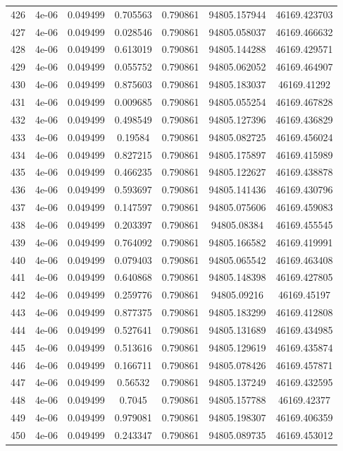 \begin{table}
\begin{tabular*}{\linewidth}{c|c|c|c|c|c|c}
426 & 4e-06 & 0.049499 & 0.705563 & 0.790861 & 94805.157944 & 46169.423703\\
427 & 4e-06 & 0.049499 & 0.028546 & 0.790861 & 94805.058037 & 46169.466632\\
428 & 4e-06 & 0.049499 & 0.613019 & 0.790861 & 94805.144288 & 46169.429571\\
429 & 4e-06 & 0.049499 & 0.055752 & 0.790861 & 94805.062052 & 46169.464907\\
430 & 4e-06 & 0.049499 & 0.875603 & 0.790861 & 94805.183037 & 46169.41292\\
431 & 4e-06 & 0.049499 & 0.009685 & 0.790861 & 94805.055254 & 46169.467828\\
432 & 4e-06 & 0.049499 & 0.498549 & 0.790861 & 94805.127396 & 46169.436829\\
433 & 4e-06 & 0.049499 & 0.19584 & 0.790861 & 94805.082725 & 46169.456024\\
434 & 4e-06 & 0.049499 & 0.827215 & 0.790861 & 94805.175897 & 46169.415989\\
435 & 4e-06 & 0.049499 & 0.466235 & 0.790861 & 94805.122627 & 46169.438878\\
436 & 4e-06 & 0.049499 & 0.593697 & 0.790861 & 94805.141436 & 46169.430796\\
437 & 4e-06 & 0.049499 & 0.147597 & 0.790861 & 94805.075606 & 46169.459083\\
438 & 4e-06 & 0.049499 & 0.203397 & 0.790861 & 94805.08384 & 46169.455545\\
439 & 4e-06 & 0.049499 & 0.764092 & 0.790861 & 94805.166582 & 46169.419991\\
440 & 4e-06 & 0.049499 & 0.079403 & 0.790861 & 94805.065542 & 46169.463408\\
441 & 4e-06 & 0.049499 & 0.640868 & 0.790861 & 94805.148398 & 46169.427805\\
442 & 4e-06 & 0.049499 & 0.259776 & 0.790861 & 94805.09216 & 46169.45197\\
443 & 4e-06 & 0.049499 & 0.877375 & 0.790861 & 94805.183299 & 46169.412808\\
444 & 4e-06 & 0.049499 & 0.527641 & 0.790861 & 94805.131689 & 46169.434985\\
445 & 4e-06 & 0.049499 & 0.513616 & 0.790861 & 94805.129619 & 46169.435874\\
446 & 4e-06 & 0.049499 & 0.166711 & 0.790861 & 94805.078426 & 46169.457871\\
447 & 4e-06 & 0.049499 & 0.56532 & 0.790861 & 94805.137249 & 46169.432595\\
448 & 4e-06 & 0.049499 & 0.7045 & 0.790861 & 94805.157788 & 46169.42377\\
449 & 4e-06 & 0.049499 & 0.979081 & 0.790861 & 94805.198307 & 46169.406359\\
450 & 4e-06 & 0.049499 & 0.243347 & 0.790861 & 94805.089735 & 46169.453012\\
\end{tabular*}
\end{table}
